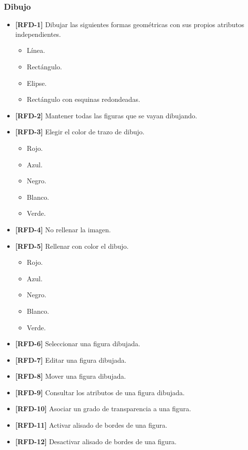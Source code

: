 \subsubsection{Dibujo}
\begin{itemize}
\item{\textbf{[RFD-1]} Dibujar las siguientes formas geométricas con sus propios atributos independientes.
\begin{itemize}
\item{Línea.}
\item{Rectángulo.}
\item{Elipse.}
\item{Rectángulo con esquinas redondeadas.}
\end{itemize}
}
\item{\textbf{[RFD-2]} Mantener todas las figuras que se vayan dibujando.}
\item{\textbf{[RFD-3]} Elegir el color de trazo de dibujo.
\begin{itemize}
\item{Rojo.}
\item{Azul.}
\item{Negro.}
\item{Blanco.}
\item{Verde.}
\end{itemize}
}
\item{\textbf{[RFD-4]} No rellenar la imagen.}
\item{\textbf{[RFD-5]} Rellenar con color el dibujo.
\begin{itemize}
\item{Rojo.}
\item{Azul.}
\item{Negro.}
\item{Blanco.}
\item{Verde.}
\end{itemize}
}
\item{\textbf{[RFD-6]} Seleccionar una figura dibujada.}
\item{\textbf{[RFD-7]} Editar una figura dibujada.}
\item{\textbf{[RFD-8]} Mover una figura dibujada.}
\item{\textbf{[RFD-9]} Consultar los atributos de una figura dibujada.}
\item{\textbf{[RFD-10]} Asociar un grado de transparencia a una figura.}
\item{\textbf{[RFD-11]} Activar alisado de bordes de una figura.}
\item{\textbf{[RFD-12]} Desactivar alisado de bordes de una figura.}
\end{itemize}
